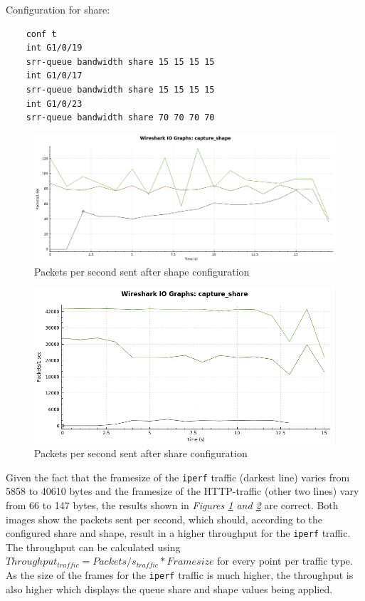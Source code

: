 \documentclass{article}
\begin{document}
Configuration for share:
\begin{verbatim}
    conf t
    int G1/0/19
    srr-queue bandwidth share 15 15 15 15
    int G1/0/17
    srr-queue bandwidth share 15 15 15 15
    int G1/0/23
    srr-queue bandwidth share 70 70 70 70
\end{verbatim}

\begin{figure}[H]
\centering
\includegraphics[width=14cm]{figures/screenshots_shape.png}
\caption{Packets per second sent after shape configuration}
\centering
\label{fig:shape_result}
\end{figure}

\begin{figure}[H]
\centering
\includegraphics[width=14cm]{figures/screenshots_share.png}
\caption{Packets per second sent after share configuration}
\centering
\label{fig:share_result}
\end{figure}

Given the fact that the framesize of the \texttt{iperf} traffic (darkest line) varies from 5858 to 40610 bytes and the framesize of the HTTP-traffic (other two lines) vary from 66 to 147 bytes, the results shown in \textit{Figures \ref{fig:shape_result} and \ref{fig:share_result}} are correct. Both images show the packets sent per second, which should, according to the configured share and shape, result in a higher throughput for the \texttt{iperf} traffic. The throughput can be calculated using $Throughput_{traffic} = Packets/s_{traffic} * Frame size$ for every point per traffic type. As the size of the frames for the \texttt{iperf} traffic is much higher, the throughput is also higher which displays the queue share and shape values being applied. 
\end{document}
